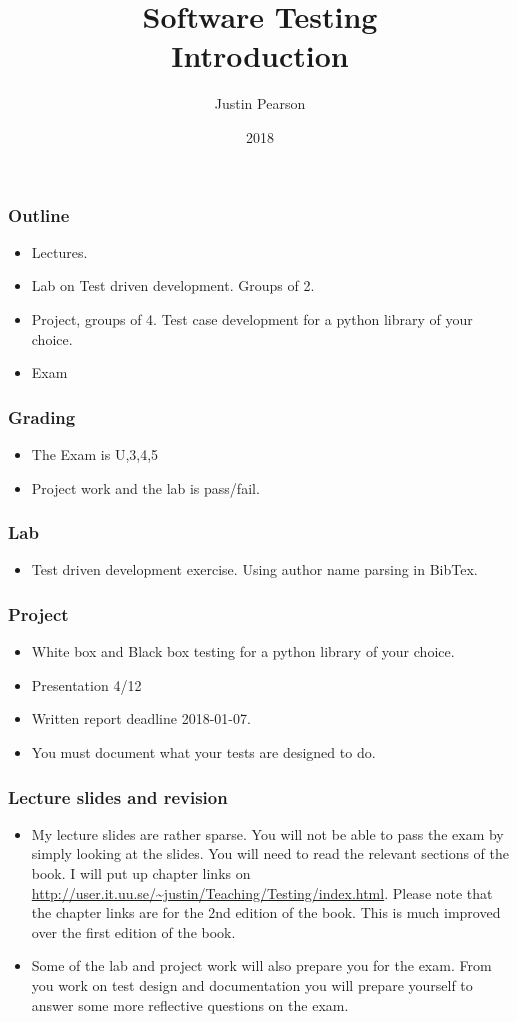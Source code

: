 \documentclass{beamer}
\title{Software Testing \\ Introduction}
\author{Justin Pearson}
\date{2018}
\begin{document}
\lstset{language=python}

\begin{frame}
  \maketitle
\end{frame}
\begin{frame}
  \frametitle{Outline}
  \begin{itemize}
  \item Lectures.
  \item Lab on Test driven development. Groups of 2.
  \item Project, groups of 4. Test case development for a python
    library of your choice.
  \item Exam
  \end{itemize}
\end{frame}
\begin{frame}
  \frametitle{Grading}
  \begin{itemize}
  \item The Exam is U,3,4,5
  \item Project work and the lab is pass/fail.
  \end{itemize}
\end{frame}
\begin{frame}
  \frametitle{Lab}
  \begin{itemize}
  \item Test driven development exercise. Using author name parsing in
    BibTex. 
  \end{itemize}
\end{frame}
\begin{frame}
  \frametitle{Project}
  \begin{itemize}
  \item White box and Black box testing for a python library of your choice.
  \item Presentation 4/12
  \item Written report deadline 2018-01-07.
  \item You must document what your tests are designed to do.
  \end{itemize}
\end{frame}
\begin{frame}
  \frametitle{Lecture slides and revision}
  \begin{itemize}
  \item   My lecture slides are rather sparse. You will not be able to pass
  the exam by simply looking at the slides. You will need to read the
  relevant sections of the book. I will put up chapter links on
  \url{http://user.it.uu.se/~justin/Teaching/Testing/index.html}. Please note
  that the chapter links are for the 2nd edition of the book. This is much
  improved over the first edition of the book. 
\item Some of the lab and project work will also prepare you for the
  exam. From you work on test design and documentation you will
  prepare yourself to answer some more reflective questions on the exam.
  \end{itemize}
\end{frame}
\end{document}
